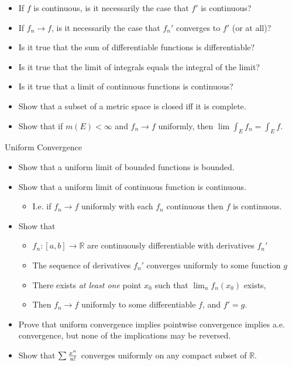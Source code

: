 \begin{itemize}
\tightlist
\item
  If \(f\) is continuous, is it necessarily the case that \(f'\) is
  continuous?
\item
  If \(f_n \to f\), is it necessarily the case that \(f_n'\) converges
  to \(f'\) (or at all)?
\item
  Is it true that the sum of differentiable functions is differentiable?
\item
  Is it true that the limit of integrals equals the integral of the
  limit?
\item
  Is it true that a limit of continuous functions is continuous?
\item
  Show that a subset of a metric space is closed iff it is complete.
\item
  Show that if \(m(E) < \infty\) and \(f_n\to f\) uniformly, then
  \(\lim \int_E f_n = \int_E f\).
\end{itemize}

Uniform Convergence

\begin{itemize}
\tightlist
\item
  Show that a uniform limit of bounded functions is bounded.
\item
  Show that a uniform limit of continuous function is continuous.

  \begin{itemize}
  \tightlist
  \item
    I.e. if \(f_n\to f\) uniformly with each \(f_n\) continuous then
    \(f\) is continuous.
  \end{itemize}
\item
  Show that

  \begin{itemize}
  \tightlist
  \item
    \(f_n: [a, b]\to {\mathbb{R}}\) are continuously differentiable with
    derivatives \(f_n'\)
  \item
    The sequence of derivatives \(f_n'\) converges uniformly to some
    function \(g\)
  \item
    There exists \emph{at least one} point \(x_0\) such that
    \(\lim_n f_n(x_0)\) exists,
  \item
    Then \(f_n \to f\) uniformly to some differentiable \(f\), and
    \(f' = g\).
  \end{itemize}
\item
  Prove that uniform convergence implies pointwise convergence implies
  a.e. convergence, but none of the implications may be reversed.
\item
  Show that \(\sum {x^n \over n!}\) converges uniformly on any compact
  subset of \({\mathbb{R}}\).
\end{itemize}

